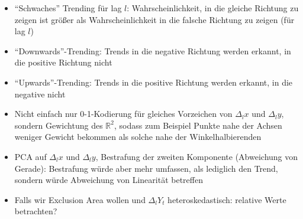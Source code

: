 \documentclass{article}
\theoremstyle{plain}%
\theoremstyle{definition}
\newcommand{\lag}[1][l]{\Delta_{#1}}
\begin{document}
\begin{itemize}
  \item \enquote{Schwaches} Trending für lag $l$: Wahrscheinlichkeit, in die gleiche Richtung zu zeigen ist größer als Wahrscheinlichkeit in die falsche Richtung zu zeigen (für lag $l$)
  \item \enquote{Downwards}-Trending: Trends in die negative Richtung werden erkannt, in die positive Richtung nicht
  \item \enquote{Upwards}-Trending: Trends in die positive Richtung werden erkannt, in die negative nicht
  \item Nicht einfach nur 0-1-Kodierung für gleiches Vorzeichen von $\lag x$ und $\lag y$, sondern Gewichtung des $\mathbb{R}^2$, sodass zum Beispiel Punkte nahe der Achsen weniger Gewicht bekommen als solche nahe der Winkelhalbierenden
  \item PCA auf $\lag x$ und $\lag y$, Bestrafung der zweiten Komponente (Abweichung von Gerade): Bestrafung würde aber mehr umfassen, als lediglich den Trend, sondern würde Abweichung von Linearität betreffen
  \item Falls wir Exclusion Area wollen und $\lag Y_t$ heteroskedastisch: relative Werte betrachten?
\end{itemize}

\end{document}
